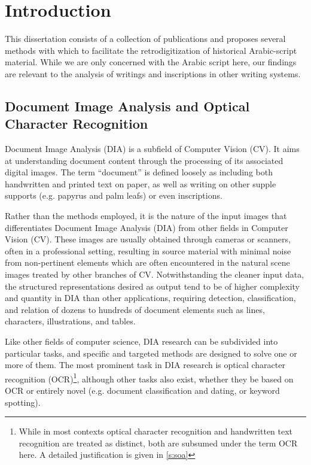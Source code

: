 \chapter{Introduction}
\thispagestyle{empty}
\label{ch:intro}
\newpage
{}

This dissertation consists of a collection of publications and proposes several
methods with which to facilitate the retrodigitization of historical
Arabic-script material. While we are only concerned with the Arabic script
here, our findings are relevant to the analysis of writings and inscriptions in
other writing systems.

\section{Document Image Analysis and Optical Character Recognition}

Document Image Analysis (DIA) is a subfield of Computer Vision (CV). It aims at
understanding document content through the processing of its associated digital
images. The term “document” is defined loosely as including both handwritten
and printed text on paper, as well as writing on other supple supports (e.g.
papyrus and palm leafs) or even inscriptions.

Rather than the methods employed, it is the nature of the input images that
differentiates Document Image Analysis (DIA) from other fields in Computer
Vision (CV).  These images are usually obtained through cameras or scanners,
often in a professional setting, resulting in source material with minimal
noise from non-pertinent elements which are often encountered in the natural
scene images treated by other branches of CV.  Notwithstanding the cleaner
input data, the structured representations desired as output tend to be of
higher complexity and quantity in DIA than other applications, requiring
detection, classification, and relation of dozens to hundreds of document
elements such as lines, characters, illustrations, and tables. 

Like other fields of computer science, DIA research can be subdivided into
particular tasks, and specific and targeted methods are designed to solve one
or more of them. The most prominent task in DIA research is optical character
recognition (OCR)\footnote{While in most contexts optical character recognition
and handwritten text recognition are treated as distinct, both are subsumed
under the term OCR here. A detailed justification is given in \ref{s:soa}},
although other tasks also exist, whether they be based on OCR or entirely novel
(e.g. document classification and dating, or keyword spotting).

